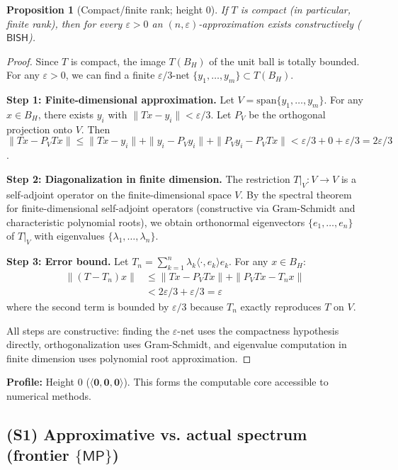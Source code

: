 \documentclass[11pt]{article}
\newcommand{\MP}{\mathsf{MP}}
\newcommand{\hzero}{\mathbf{0}}
\newcommand{\allzero}{\langle \hzero,\hzero,\hzero\rangle}
\newcommand{\leanok}{\text{\tiny [✓ Lean]}}
\theoremstyle{plain}
\newtheorem{proposition}[theorem]{Proposition}
\theoremstyle{definition}
\theoremstyle{remark}
\newcommand{\BISH}{\mathsf{BISH}}
\begin{document}
\begin{proposition}[Compact/finite rank; height $0$] \leanok
If $T$ is compact (in particular, finite rank), then for every $\varepsilon>0$ an $(n,\varepsilon)$-approximation exists constructively ($\BISH$).
\end{proposition}

\begin{proof}
Since $T$ is compact, the image $T(B_H)$ of the unit ball is totally bounded. For any $\varepsilon > 0$, we can find a finite $\varepsilon/3$-net $\{y_1, \ldots, y_m\} \subset T(B_H)$.

\textbf{Step 1: Finite-dimensional approximation.}
Let $V = \text{span}\{y_1, \ldots, y_m\}$. For any $x \in B_H$, there exists $y_i$ with $\|Tx - y_i\| < \varepsilon/3$. 
Let $P_V$ be the orthogonal projection onto $V$. Then $\|Tx - P_V Tx\| \leq \|Tx - y_i\| + \|y_i - P_V y_i\| + \|P_V y_i - P_V Tx\| < \varepsilon/3 + 0 + \varepsilon/3 = 2\varepsilon/3$.

\textbf{Step 2: Diagonalization in finite dimension.}
The restriction $T|_V: V \to V$ is a self-adjoint operator on the finite-dimensional space $V$. 
By the spectral theorem for finite-dimensional self-adjoint operators (constructive via Gram-Schmidt and characteristic polynomial roots), 
we obtain orthonormal eigenvectors $\{e_1, \ldots, e_n\}$ of $T|_V$ with eigenvalues $\{\lambda_1, \ldots, \lambda_n\}$.

\textbf{Step 3: Error bound.}
Let $T_n = \sum_{k=1}^n \lambda_k \langle \cdot, e_k\rangle e_k$. For any $x \in B_H$:
\begin{align}
\|(T - T_n)x\| &\leq \|Tx - P_V Tx\| + \|P_V Tx - T_n x\| \\
&< 2\varepsilon/3 + \varepsilon/3 = \varepsilon
\end{align}
where the second term is bounded by $\varepsilon/3$ because $T_n$ exactly reproduces $T$ on $V$.

All steps are constructive: finding the $\varepsilon$-net uses the compactness hypothesis directly, orthogonalization uses Gram-Schmidt, and eigenvalue computation in finite dimension uses polynomial root approximation.
\end{proof}

\noindent\textbf{Profile:} Height 0 ($\allzero$). This forms the computable core accessible to numerical methods.

\subsection{(S1) Approximative vs. actual spectrum (frontier $\{\MP\}$)} \leanok
\end{document}
